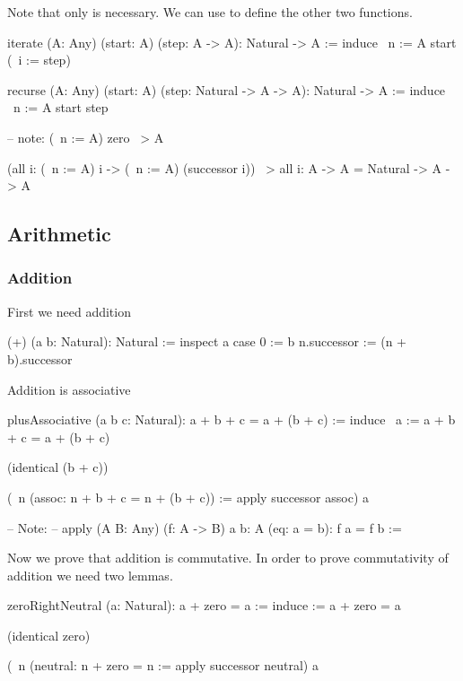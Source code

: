 Note that only  is necessary. We can use  to define
the other two functions.

\begin{alba}
    iterate (A: Any) (start: A) (step: A -> A): Natural -> A :=
        induce {\ n := A} start (\ i := step)

    recurse (A: Any) (start: A) (step: Natural -> A -> A): Natural -> A :=
        induce {\ n := A} start step

    -- note:
        (\ n := A) zero ~>  A

        (all i: (\ n := A) i -> (\ n := A) (successor i))
        ~>  all i: A -> A
        =   Natural -> A -> A
\end{alba}







\vskip 5mm
\subsection{Arithmetic}


\subsubsection{Addition}


First we need addition
\begin{alba}
  (+) (a b: Natural): Natural :=
    inspect a case
      0 :=
        b
      n.successor :=
        (n + b).successor
\end{alba}


Addition is associative
%
\begin{alba}
    plusAssociative (a b c: Natural): a + b + c = a + (b + c) :=
        induce
            {\ a := a + b + c = a + (b + c)}

            (identical (b + c))

            (\ n (assoc: n + b + c = n + (b + c)) :=
                apply successor assoc)
            a

    -- Note:
    -- apply (A B: Any) (f: A -> B) {a b: A} (eq: a = b): f a = f b :=
\end{alba}


Now we prove that addition is commutative. In order to prove commutativity of
addition we need two lemmas.

\begin{alba}
    zeroRightNeutral (a: Natural): a + zero = a :=
        induce
            {\a := a + zero = a}

            (identical zero)

            (\ n (neutral: n + zero = n :=
                apply successor neutral)
            a
\end{alba}



